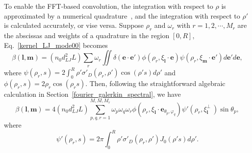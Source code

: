 To enable the FFT-based convolution, the integration with respect to $\rho$ is approximated by a numerical quadrature~\cite{Hu2012,wuPoF2015}, and the integration with respect to $\rho'$ is calculated accurately, or vise versa. Suppose $\rho_r$ and $\omega_r$ with $r=1,2,\cdots,M_r$ are the abscissas and weights of a quadrature in the region $[0,R]$, Eq.~\eqref{kernel_LJ_mode00} becomes
\begin{equation}
\beta(\bm{l},\bm{m})=(n_0d_{LJ}^2L)\sum_{r}\omega_r\iint  \delta(\bm{e}\cdot{\bm{e}'})\phi(\rho_r,\xi_{\bm{l}}\cdot{\bm{e}})\psi(\rho_r,\xi_{\bm{m}}\cdot{\bm{e}'})d\bm{e}'d\bm{e},
\end{equation} 
where $\psi(\rho_r,s)=2\int_0^R \rho'\sigma'_D(\rho_r,\rho')\cos(\rho's) d\rho'$ and $\phi(\rho_r,s)=2\rho_r\cos(\rho_rs)$. Then, following the straightforward algebraic calculation in Section~\ref{fourier_galerkin_spectral}, we have
\begin{equation} \label{kernel_modee}
\beta(\bm{l},\bm{m})= 4(n_0d_{LJ}^2L)\sum_{p,q,r=1}^{M,M,M_r}{\omega_p\omega_q\omega_r}
\phi(\rho_r,\xi_{\bm{l}}\cdot{\bm{e}_{\theta_p,\varphi_q}}) 
\psi'\left(\rho_r,\xi^\perp_{\bm{l}}\
\right) \sin\theta_p,
\end{equation}
where
\begin{equation}\label{psi_expression}
\psi'(\rho_r,s)=2\pi\int_0^R \rho'\sigma'_D(\rho_r,\rho')J_0(\rho' s)d\rho'.
\end{equation}

